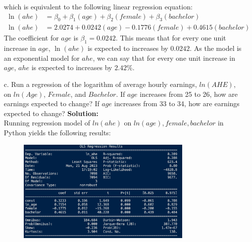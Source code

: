 \documentclass{uofa-eng-assignment}
\begin{document}
\begin{enumerate}
\begin{figure}[H]
        \end{figure}
        which is equivalent to the following linear regression equation:
        \begin{align*}
            \ln{(ahe)} & = \beta_0 + \beta_1 (age) + \beta_2 (female) + \beta_3 (bachelor) \\
            \ln{(ahe)} & = 2.0274 + 0.0242 (age) - 0.1776 (female) + 0.4615 (bachelor)
        \end{align*}
        The coefficient for $age$ is $\beta_1 = 0.0242$.
        This means that for every one unit increase in $age$, $\ln{(ahe)}$ is expected to increases by $0.0242$.
        As the model is an exponential model for $ahe$, we can say that for every one unit increase in $age$,
        $ahe$ is expected to increases by $\boldsymbol{2.42\%}$.
    \item[c.] Run a regression of the logarithm of average hourly earnings, $ln(AHE)$, on
        $ln(Age)$, $Female$, and $Bachelor$. If $age$ increases from 25 to 26, how are
        earnings expected to change? If $age$ increases from 33 to 34, how are earnings
        expected to change? \newpage \textbf{Solution:} \\ Running regression model of
        $ln(ahe)$ on $ln(age), female, bachelor$ in Python yields the following
        results:
        \begin{figure}[H]
            \centering
            \includegraphics[width=0.80\textwidth]{final-exam-c-1.png}

\end{figure}
\end{enumerate}
\end{document}

